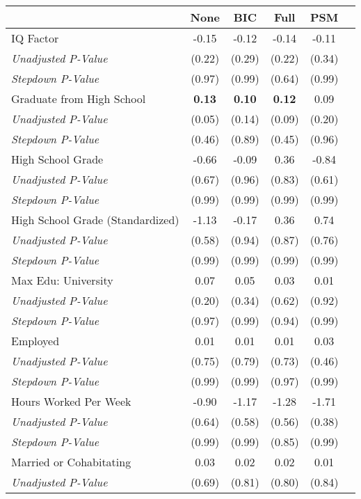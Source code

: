 \begin{tabular}{l c c c c c}
\toprule
 & None & BIC & Full & PSM \\
\midrule
IQ Factor & -0.15 & -0.12 & -0.14 & -0.11 \\
\quad \textit{Unadjusted P-Value} & (0.22) & (0.29) & (0.22) & (0.34) \\
\quad \textit{Stepdown P-Value} & (0.97) & (0.99) & (0.64) & (0.99) \\
Graduate from High School & \textbf{ 0.13 } & \textbf{ 0.10 } & \textbf{ 0.12 } & 0.09 \\
\quad \textit{Unadjusted P-Value} & (0.05) & (0.14) & (0.09) & (0.20) \\
\quad \textit{Stepdown P-Value} & (0.46) & (0.89) & (0.45) & (0.96) \\
High School Grade & -0.66 & -0.09 & 0.36 & -0.84 \\
\quad \textit{Unadjusted P-Value} & (0.67) & (0.96) & (0.83) & (0.61) \\
\quad \textit{Stepdown P-Value} & (0.99) & (0.99) & (0.99) & (0.99) \\
High School Grade (Standardized) & -1.13 & -0.17 & 0.36 & 0.74 \\
\quad \textit{Unadjusted P-Value} & (0.58) & (0.94) & (0.87) & (0.76) \\
\quad \textit{Stepdown P-Value} & (0.99) & (0.99) & (0.99) & (0.99) \\
Max Edu: University & 0.07 & 0.05 & 0.03 & 0.01 \\
\quad \textit{Unadjusted P-Value} & (0.20) & (0.34) & (0.62) & (0.92) \\
\quad \textit{Stepdown P-Value} & (0.97) & (0.99) & (0.94) & (0.99) \\
Employed & 0.01 & 0.01 & 0.01 & 0.03 \\
\quad \textit{Unadjusted P-Value} & (0.75) & (0.79) & (0.73) & (0.46) \\
\quad \textit{Stepdown P-Value} & (0.99) & (0.99) & (0.97) & (0.99) \\
Hours Worked Per Week & -0.90 & -1.17 & -1.28 & -1.71 \\
\quad \textit{Unadjusted P-Value} & (0.64) & (0.58) & (0.56) & (0.38) \\
\quad \textit{Stepdown P-Value} & (0.99) & (0.99) & (0.85) & (0.99) \\
Married or Cohabitating & 0.03 & 0.02 & 0.02 & 0.01 \\
\quad \textit{Unadjusted P-Value} & (0.69) & (0.81) & (0.80) & (0.84) \\

\end{tabular}

